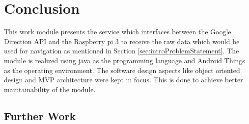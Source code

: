 \newpage
\chapter{Conclusion}
    This work module presents the service which interfaces
    between the Google Direction API and the Raspberry pi 3
    to receive the raw data which would be used for navigation
    as mentioned in Section \ref{sec:introProblemStatement}.
    The module is realized using java as the programming 
    language and Android Things \cite{androidThings} as the
    operating environment. The software design aspects like
    object oriented design and MVP \cite{mvp} architecture 
    were kept in focus. This is done to achieve  
    better maintainability of the module. 
    
\section{Further Work}